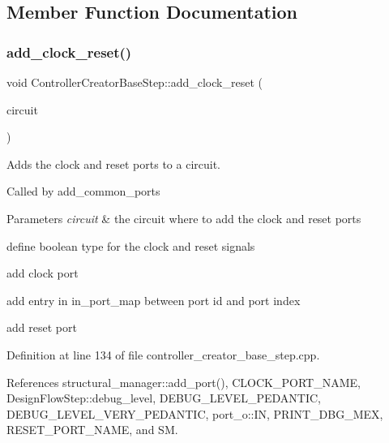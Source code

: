 \subsection{Member Function Documentation}
\mbox{\label{classControllerCreatorBaseStep_af4f27f2275640d4ff0ab51374597b0ad}} 
\subsubsection{\texorpdfstring{add\+\_\+clock\+\_\+reset()}{add\_clock\_reset()}}
{\footnotesize\ttfamily void Controller\+Creator\+Base\+Step\+::add\+\_\+clock\+\_\+reset (\begin{DoxyParamCaption}\item[{\hyperlink{structural__objects_8hpp_a8ea5f8cc50ab8f4c31e2751074ff60b2}{structural\+\_\+object\+Ref}}]{circuit }\end{DoxyParamCaption})\hspace{0.3cm}{\ttfamily [private]}}



Adds the clock and reset ports to a circuit. 

Called by add\+\_\+common\+\_\+ports 
\begin{DoxyParams}{Parameters}
{\em circuit} & the circuit where to add the clock and reset ports \\
\hline
\end{DoxyParams}
define boolean type for the clock and reset signals

add clock port

add entry in in\+\_\+port\+\_\+map between port id and port index

add reset port 

Definition at line 134 of file controller\+\_\+creator\+\_\+base\+\_\+step.\+cpp.



References structural\+\_\+manager\+::add\+\_\+port(), C\+L\+O\+C\+K\+\_\+\+P\+O\+R\+T\+\_\+\+N\+A\+ME, Design\+Flow\+Step\+::debug\+\_\+level, D\+E\+B\+U\+G\+\_\+\+L\+E\+V\+E\+L\+\_\+\+P\+E\+D\+A\+N\+T\+IC, D\+E\+B\+U\+G\+\_\+\+L\+E\+V\+E\+L\+\_\+\+V\+E\+R\+Y\+\_\+\+P\+E\+D\+A\+N\+T\+IC, port\+\_\+o\+::\+IN, P\+R\+I\+N\+T\+\_\+\+D\+B\+G\+\_\+\+M\+EX, R\+E\+S\+E\+T\+\_\+\+P\+O\+R\+T\+\_\+\+N\+A\+ME, and SM.




